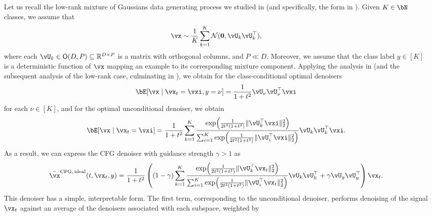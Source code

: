\documentclass[../../book-main.tex]{subfiles}
\begin{document}
\begin{example}\label{example:denoising-gaussian-mixture-cfg}
  Let us recall the low-rank mixture of Gaussians data generating process we studied in
   (and specifically, the form in
  ). Given $K \in \bN$ classes, we assume that
  \begin{equation}\label{eq:MoG1-ch6}
    \vx \sim \frac{1}{K}\sum_{k = 1}^{K}\dNorm(\vzero, \vU_{k}\vU_{k}^{\top}),
  \end{equation}
  where each \(\vU_{k} \in \O(D, P) \subseteq \R^{D \times P}\) is a matrix with
  orthogonal columns, and $P \ll D$.
  Moreover, we assume that the class label $y \in [K]$ is a deterministic
  function of $\vx$ mapping an example to its corresponding mixture component.
  Applying the analysis in  (and the
  subsequent analysis of the low-rank case, culminating in
  ), we obtain for the class-conditional optimal
  denoisers
  \begin{equation}\label{eq:gmm_lowrank_denoiser-ch6-classcond}
    \bE[ \vx \mid \vx_t = \vxi, y = \nu ]
    = \frac{1}{1 + t^{2}}
    \vU_{\nu}\vU_{\nu}^{\top}\vxi
  \end{equation}
  for each $\nu \in [K]$, and for the optimal unconditional denoiser, we obtain
  \begin{equation}\label{eq:gmm_lowrank_denoiser-ch6-uncond}
    \bE[ \vx \mid \vx_t = \vxi ]
    = \frac{1}{1 + t^{2}}\sum_{k = 1}^{K}\frac{\exp\rp{\frac{1}{2t^{2}(1 + t^{2})}\norm{\vU_{k}^{\top}\vxi}_{2}^{2}}}{\sum_{i = 1}^{K}\exp\rp{\frac{1}{2t^{2}(1 + t^{2})}\norm{\vU_{i}^{\top}\vxi}_{2}^{2}}}\vU_{k}\vU_{k}^{\top}\vxi.
  \end{equation}
  As a result, we can express the CFG denoiser with guidance strength $\gamma
  > 1$ as
  \begin{equation}\label{eq:cfg-denoiser-mog-low-rank}
    \bar{\vx}^{\mathrm{CFG,\,ideal}}(t, \vx_t, y)
    =
    \frac{1}{1 + t^{2}}
    \left(
    (1 - \gamma) 
    \sum_{k = 1}^{K}\frac{\exp\rp{\frac{1}{2t^{2}(1
    + t^{2})}\norm{\vU_{k}^{\top}\vx_t}_{2}^{2}}}{\sum_{i
    = 1}^{K}\exp\rp{\frac{1}{2t^{2}(1
    + t^{2})}\norm{\vU_{i}^{\top}\vx_t}_{2}^{2}}}\vU_{k}\vU_{k}^{\top}
    +
    \gamma 
    \vU_{y}\vU_{y}^{\top}
    \right)
    \vx_t.
  \end{equation}
  This denoiser has a simple, interpretable form. The first term, corresponding
  to the unconditional denoiser, performs denoising of the signal $\vx_t$
  against an average of the denoisers associated with each subspace, weighted by

\end{example}
\end{document}

